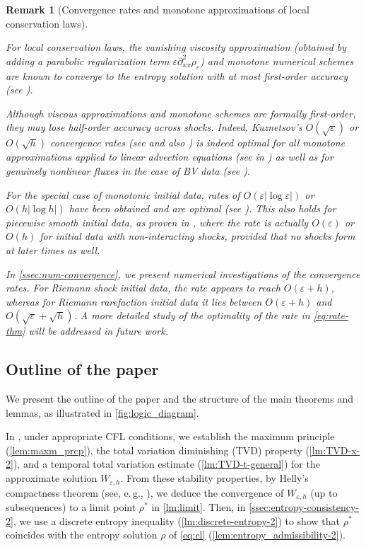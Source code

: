\documentclass[10pt]{amsart}
\theoremstyle{plain}
\newtheorem{remark}[lemma]{Remark}
\theoremstyle{definition}
\numberwithin{equation}{section}
\newcommand{\eps}{{\varepsilon}}
\newcommand{\pxx}{\partial_{xx}^2}
\begin{document}
\begin{remark}[Convergence rates and monotone approximations of local conservation laws]\label{rk:local-convergence-references}

For local conservation laws, the vanishing viscosity approximation (obtained by adding a parabolic regularization term $\eps \pxx \rho_\eps$) and monotone numerical schemes are known to converge to the entropy solution with at most first-order accuracy (see \cite{MR551288,MR413526}). 

Although viscous approximations and monotone schemes are formally first-order, they may lose half-order accuracy across shocks. Indeed, Kuznetsov's $O(\sqrt{\eps})$ or $O(\sqrt{h})$ convergence rates (see \cite{MR483509} and also \cite{MR811184,MR679435,MR1111445}) is indeed optimal for all monotone approximations applied to linear advection equations (see in \cite{MR1270625}) as well as for genuinely nonlinear fluxes in the case of BV data (see \cite{MR1480382}). 

For the special case of monotonic initial data, rates of $O(\eps|\log \eps|)$ or $O(h |\log h|)$ have been obtained and are optimal (see \cite{MR929127}). This also holds for piecewise smooth initial data, as proven in \cite{MR1397446,MR1451109,MR1646744}, where the rate is actually $O(\eps)$ or $O(h)$ for initial data with non-interacting shocks, provided that no shocks form at later times as well.

In \cref{ssec:num-convergence}, we present numerical investigations of the convergence rates. For Riemann shock initial data, the rate appears to reach $O(\varepsilon + h)$, whereas for Riemann rarefaction initial data it lies between $O(\varepsilon + h)$ and $O(\sqrt{\varepsilon} + \sqrt{h})$. A more detailed study of the optimality of the rate in \cref{eq:rate-thm} will be addressed in future work.


\end{remark}


\subsection{Outline of the paper}
\label{ssec:outline}

We present the outline of the paper and the structure of the main theorems and lemmas, as illustrated in \cref{fig:logic_diagram}.

In , under appropriate CFL conditions, we establish the maximum principle (\cref{lem:maxm_prcp}), the total variation diminishing (TVD) property (\cref{lm:TVD-x-2}), and a temporal total variation estimate (\cref{lm:TVD-t-general}) for the approximate solution $W_{\eps,h}$. From these stability properties, by Helly's compactness theorem (see, e.\,g., \cite[Theorem 2.3, p.~14]{MR1816648}), we deduce the convergence of $W_{\eps,h}$ (up to subsequences) to a limit point $\rho^*$ in \cref{lm:limit}. Then, in \cref{ssec:entropy-consistency-2}, we use a discrete entropy inequality (\cref{lm:discrete-entropy-2}) to show that $\rho^*$ coincides with the entropy solution $\rho$ of \cref{eq:cl} (\cref{lem:entropy_admissibility-2}).
\end{document}
